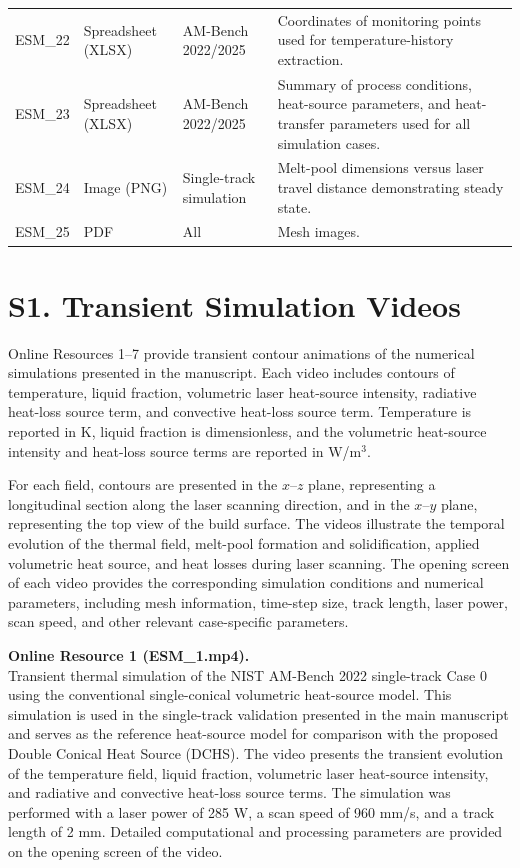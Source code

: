 \documentclass[11pt]{article}
\begin{document}
\begin{longtable}{p{} p{} p{} p{}}
ESM\_22 &
Spreadsheet (XLSX) &
AM-Bench 2022/2025 &
Coordinates of monitoring points used for temperature-history extraction. \\

ESM\_23 &
Spreadsheet (XLSX) &
AM-Bench 2022/2025 &
Summary of process conditions, heat-source parameters, and heat-transfer
parameters used for all simulation cases. \\

\midrule

ESM\_24 &
Image (PNG) &
Single-track simulation &
Melt-pool dimensions versus laser travel distance demonstrating steady state. \\

\midrule

ESM\_25 &
PDF &
All &
Mesh images. \\
\bottomrule
\end{longtable}

\section*{S1. Transient Simulation Videos}

Online Resources 1--7 provide transient contour animations of the numerical
simulations presented in the manuscript. Each video includes contours of
temperature, liquid fraction, volumetric laser heat-source intensity,
radiative heat-loss source term, and convective heat-loss source term.
Temperature is reported in K, liquid fraction is dimensionless, and the
volumetric heat-source intensity and heat-loss source terms are reported in
W/m$^3$.

For each field, contours are presented in the $x$--$z$ plane, representing
a longitudinal section along the laser scanning direction, and in the
$x$--$y$ plane, representing the top view of the build surface. The videos
illustrate the temporal evolution of the thermal field, melt-pool formation
and solidification, applied volumetric heat source, and heat losses during
laser scanning. The opening screen of each video provides the corresponding
simulation conditions and numerical parameters, including mesh information,
time-step size, track length, laser power, scan speed, and other relevant
case-specific parameters.


\textbf{Online Resource 1 (ESM\_1.mp4).}\\
Transient thermal simulation of the NIST AM-Bench 2022 single-track
Case 0 using the conventional single-conical volumetric heat-source
model. This simulation is used in the single-track validation presented
in the main manuscript and serves as the reference heat-source model
for comparison with the proposed Double Conical Heat Source (DCHS).
The video presents the transient evolution of the temperature field,
liquid fraction, volumetric laser heat-source intensity, and radiative
and convective heat-loss source terms. The simulation was performed
with a laser power of 285 W, a scan speed of 960 mm/s, and a track
length of 2 mm. Detailed computational and processing parameters are
provided on the opening screen of the video.
\end{document}
